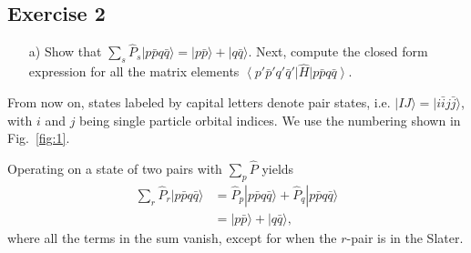 \documentclass[a4paper]{article}
\newcommand{\fig}[1]{Fig.\ \ref{fig:#1}}
\newcommand{\nn}{\nonumber}
\begin{document}
\subsection*{Exercise 2}
\begin{exframe}
\begin{itemize}
  \item[a)] Show that $\sum_s \hat P_s |p\bar p q \bar q\rangle = |p\bar p\rangle + |q \bar q\rangle$. Next, compute the closed form expression for all the matrix elements $\left\langle p'\bar p' q' \bar q' \right|\hat H \left|p\bar p q \bar q \right\rangle$.
\end{itemize}
\end{exframe}
From now on, states labeled by capital letters denote pair states, i.e. $|IJ\rangle = |i\bar i j\bar j\rangle$, with $i$ and $j$ being single particle orbital indices. We use the numbering shown in \fig{1}.

Operating on a state of two pairs with $\sum_p \hat P$ yields
\begin{align}
\sum_r \hat P_r |p\bar p q\bar q\rangle &= \hat P_p |p\bar p q\bar q\rangle + \hat P_q |p\bar p q\bar q\rangle \nn\\
%
&= |p\bar p \rangle + |q\bar q\rangle,
\end{align}
where all the terms in the sum vanish, except for when the $r$-pair is in the Slater.
\end{document}
